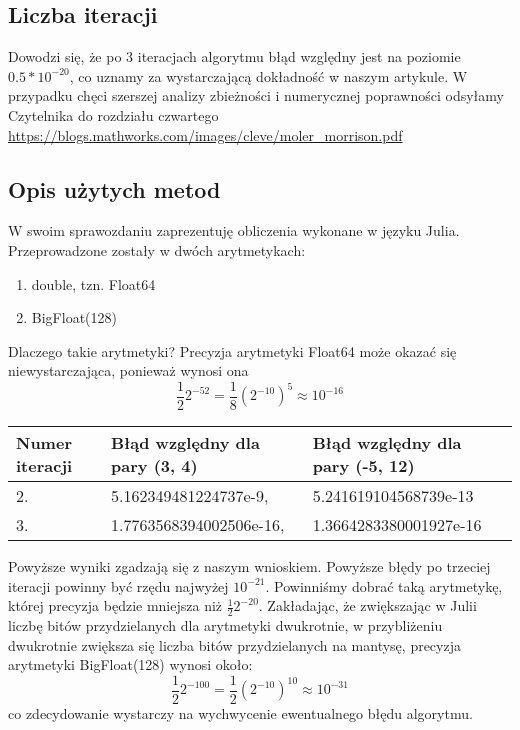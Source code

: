 \documentclass{article}
\begin{document}
        \subsection{Liczba iteracji}
            \indent Dowodzi się, że po 3 iteracjach algorytmu błąd względny jest na poziomie $0.5 * 10^{-20}$, 
            co uznamy za wystarczającą dokładność w naszym artykule. W przypadku chęci szerszej analizy zbieżności i numerycznej poprawności
	    odsyłamy Czytelnika do rozdziału czwartego \url{https://blogs.mathworks.com/images/cleve/moler_morrison.pdf}
            \par
	    
	\subsection{Opis użytych metod}
	    \indent W swoim sprawozdaniu zaprezentuję obliczenia wykonane w języku Julia.
	    Przeprowadzone zostały w dwóch arytmetykach:
	    \begin{enumerate}
	        \item double, tzn. Float64
		\item BigFloat(128)
	    \end{enumerate}
            \par
	    
	    \indent Dlaczego takie arytmetyki? Precyzja arytmetyki Float64 może okazać się niewystarczająca, ponieważ wynosi ona
	    \[\frac{1}{2}2^{-52} = \frac{1}{8}{(2^{-10})}^5 \approx 10^{-16}\]
	    
	    \begin{center}
	       \begin{tabular}{| l | l | l |}
	           \hline
		   Numer iteracji  &  Błąd względny dla pary (3, 4)  &  Błąd względny dla pary (-5, 12)\\
		   \hline
		   2.              &  5.162349481224737e-9,         &  5.241619104568739e-13\\
		   3.              &  1.7763568394002506e-16,       &  1.3664283380001927e-16\\
		   \hline
	       \end{tabular}
	    \end{center}
	    
	    Powyższe wyniki zgadzają się z naszym wnioskiem. Powyższe błędy po trzeciej iteracji powinny być rzędu najwyżej $10^{-21}$.
	    Powinniśmy dobrać taką arytmetykę, której precyzja będzie mniejsza niż $\frac{1}{2}2^{-20}$. Zakładając, że zwiększając w Julii liczbę bitów przydzielanych dla arytmetyki dwukrotnie, w przybliżeniu
	    dwukrotnie zwiększa się liczba bitów przydzielanych na mantysę, precyzja arytmetyki BigFloat(128) wynosi około:
	    \[\frac{1}{2}2^{-100} = \frac{1}{2}{(2^{-10})}^{10} \approx 10^{-31}\] co zdecydowanie wystarczy na wychwycenie ewentualnego
	    błędu algorytmu.
	    
\end{document}
